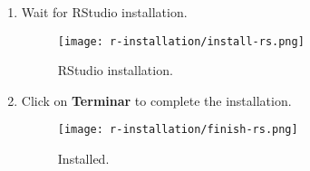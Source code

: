 \begin{enumerate}
    \item Wait for RStudio installation.
        \begin{figure}[H]
            \centering
            \texttt{[image: r-installation/install-rs.png]}
            \caption{RStudio installation.}
            \label{fig:install-rs}
        \end{figure}
    
    \item Click on \textbf{Terminar} to complete the installation.
        \begin{figure}[H]
            \centering
            \texttt{[image: r-installation/finish-rs.png]}
            \caption{Installed.}
            \label{fig:finish-rs}
        \end{figure}
\end{enumerate}